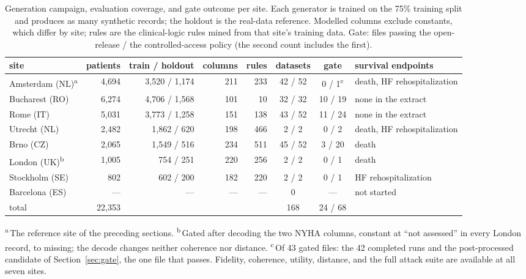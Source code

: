 \documentclass[11pt,a4paper]{article}
\begin{document}
\begin{table}[htbp]
\centering
\footnotesize
\setlength{\tabcolsep}{3.5pt}
\caption{Generation campaign, evaluation coverage, and gate outcome per site.
Each generator is trained on the 75\% training split and produces as many
synthetic records; the holdout is the real-data reference. Modelled columns
exclude constants, which differ by site; rules are the clinical-logic rules mined
from that site's training data. Gate: files passing the open-release / the
controlled-access policy (the second count includes the first).}
\label{tab:sites}
\begin{tabular}{lrrrrccp{3.5cm}}
\toprule
site & patients & train / holdout & columns & rules & datasets & gate & survival endpoints \\
\midrule
Amsterdam (NL)\textsuperscript{a} & 4{,}694 & 3{,}520 / 1{,}174 & 211 & 233 & 42 / 52 & 0 / 1\textsuperscript{c} & death, HF rehospitalization \\
Bucharest (RO) & 6{,}274 & 4{,}706 / 1{,}568 & 101 & 10 & 32 / 32 & 10 / 19 & none in the extract \\
Rome (IT) & 5{,}031 & 3{,}773 / 1{,}258 & 151 & 138 & 43 / 52 & 11 / 24 & none in the extract \\
Utrecht (NL) & 2{,}482 & 1{,}862 / 620 & 198 & 466 & 2 / 2 & 0 / 2 & death, HF rehospitalization \\
Brno (CZ) & 2{,}065 & 1{,}549 / 516 & 234 & 511 & 45 / 52 & 3 / 20 & death \\
London (UK)\textsuperscript{b} & 1{,}005 & 754 / 251 & 220 & 256 & 2 / 2 & 0 / 1 & death \\
Stockholm (SE) & 802 & 602 / 200 & 182 & 220 & 2 / 2 & 0 / 1 & HF rehospitalization \\
Barcelona (ES) & --- & --- & --- & --- & 0 & --- & not started \\
\midrule
total & 22{,}353 & & & & 168 & 24 / 68 & \\
\bottomrule
\end{tabular}

\raggedright\footnotesize \textsuperscript{a}\,The reference site of the
preceding sections. \textsuperscript{b}\,Gated after decoding the two NYHA
columns, constant at ``not assessed'' in every London record, to missing; the
decode changes neither coherence nor distance. \textsuperscript{c}\,Of 43 gated
files: the 42 completed runs and the post-processed candidate of
Section~\ref{sec:gate}, the one file that passes. Fidelity, coherence, utility,
distance, and the full attack suite are available at all seven sites.
\end{table}
\end{document}
